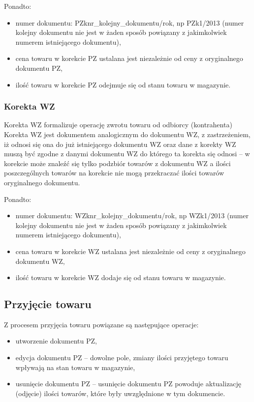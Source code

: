 Ponadto:
\begin{itemize}
\item numer dokumentu: PZknr\_kolejny\_dokumentu/rok, np PZk1/2013
  (numer kolejny dokumentu nie jest w żaden sposób powiązany z
  jakimkolwiek numerem istniejącego dokumentu),
\item cena towaru w korekcie PZ ustalana jest niezależnie od ceny z
  oryginalnego dokumentu PZ,
\item ilość towaru w korekcie PZ odejmuje się od stanu towaru w
  magazynie.
\end{itemize}

\subsubsection{Korekta WZ}
Korekta WZ formalizuje operację zwrotu towaru od odbiorcy
(kontrahenta) Korekta WZ jest dokumentem analogicznym do dokumentu WZ,
z zastrzeżeniem, iż odnosi się ona do już istniejącego dokumentu WZ
oraz dane z korekty WZ muszą być zgodne z danymi dokumentu WZ do
którego ta korekta się odnosi -- w korekcie może znaleźć się tylko
podzbiór towarów z dokumentu WZ a ilości poszczególnych towarów na
korekcie nie mogą przekraczać ilości towarów oryginalnego dokumentu.

Ponadto:
\begin{itemize}
\item numer dokumentu: WZknr\_kolejny\_dokumentu/rok, np WZk1/2013
  (numer kolejny dokumentu nie jest w żaden sposób powiązany z
  jakimkolwiek numerem istniejącego dokumentu),
\item cena towaru w korekcie WZ ustalana jest niezależnie od ceny z
  oryginalnego dokumentu WZ,
\item ilość towaru w korekcie WZ dodaje się od stanu towaru w
  magazynie.
\end{itemize}

\subsection{Przyjęcie towaru}
Z procesem przyjęcia towaru powiązane są następujące operacje:
\begin{itemize}
\item utworzenie dokumentu PZ,
\item edycja dokumentu PZ -- dowolne pole, zmiany ilości przyjętego
  towaru wpływają na stan towaru w magazynie,
\item usunięcie dokumentu PZ -- usunięcie dokumentu PZ powoduje
  aktualizację (odjęcie) ilości towarów, które były uwzględnione w tym
  dokumencie.
\end{itemize}

